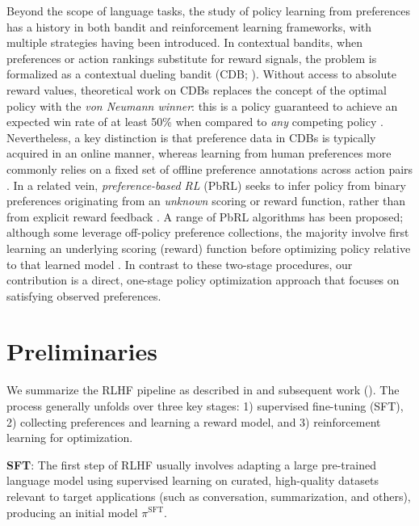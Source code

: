 Beyond the scope of language tasks, the study of policy learning from preferences has a history in both bandit and reinforcement learning frameworks, with multiple strategies having been introduced. In contextual bandits, when preferences or action rankings substitute for reward signals, the problem is formalized as a contextual dueling bandit (CDB; \cite{yue2012karmed,dudik2015contextual}). Without access to absolute reward values, theoretical work on CDBs replaces the concept of the optimal policy with the \textit{von Neumann winner}: this is a policy guaranteed to achieve an expected win rate of at least 50\% when compared to \textit{any} competing policy \citep{dudik2015contextual}. Nevertheless, a key distinction is that preference data in CDBs is typically acquired in an online manner, whereas learning from human preferences more commonly relies on a fixed set of offline preference annotations across action pairs \citep{yan2022human}. In a related vein, \textit{preference-based RL} (PbRL) seeks to infer policy from binary preferences originating from an \textit{unknown} scoring or reward function, rather than from explicit reward feedback \citep{BusaFekete2014,ruiz2023dueling}. A range of PbRL algorithms has been proposed; although some leverage off-policy preference collections, the majority involve first learning an underlying scoring (reward) function before optimizing policy relative to that learned model \citep{jain2013learning,BusaFekete2014,christiano2017deep,sadigh2017active,kupcsik2018learning}. In contrast to these two-stage procedures, our contribution is a direct, one-stage policy optimization approach that focuses on satisfying observed preferences.

\section{Preliminaries}\label{section:prelims}

We summarize the RLHF pipeline as described in \citeauthor{ziegler2020finetuning} and subsequent work (\citep{stiennon2022learning, bai2022training, ouyang2022training}). The process generally unfolds over three key stages: 1) supervised fine-tuning (SFT), 2) collecting preferences and learning a reward model, and 3) reinforcement learning for optimization.

\textbf{SFT}: The first step of RLHF usually involves adapting a large pre-trained language model using supervised learning on curated, high-quality datasets relevant to target applications (such as conversation, summarization, and others), producing an initial model $\pi^\text{SFT}$. 

